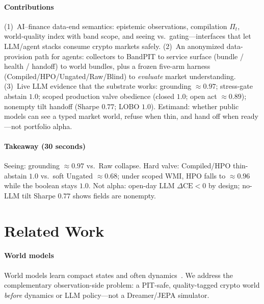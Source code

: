 \documentclass[sigconf,anonymous]{acmart}
\theoremstyle{acmdefinition}%
\theoremstyle{acmplain}%
\begin{document}
\paragraph{Contributions}
(1)~AI--finance data-end semantics: epistemic observations, compilation \(\Pi_t\), world-quality index with band scope, and seeing vs.\ gating---interfaces that let LLM/agent stacks consume crypto markets safely.
(2)~An anonymized data-provision path for agents: collectors to BandPIT to service surface (bundle / health / handoff) to world bundles, plus a frozen five-arm harness (Compiled/HPO/Ungated/Raw/Blind) to \emph{evaluate} market understanding.
(3)~Live LLM evidence that the substrate works: grounding \({\approx}0.97\); stress-gate abstain \(1.0\); scoped production valve obedience (closed \(1.0\); open act \({\approx}0.89\)); nonempty tilt handoff (Sharpe \(0.77\); LOBO \(1.0\)).
Estimand: whether public models can see a typed market world, refuse when thin, and hand off when ready---not portfolio alpha.

\paragraph{Takeaway (30 seconds)}
Seeing: grounding \({\approx}0.97\) vs.\ Raw collapse.
Hard valve: Compiled/HPO thin-abstain \(1.0\) vs.\ soft Ungated \({\approx}0.68\); under scoped WMI, HPO falls to \({\approx}0.96\) while the boolean stays \(1.0\).
Not alpha: open-day LLM \(\Delta\mathrm{CE}{<}0\) by design; no-LLM tilt Sharpe \(0.77\) shows fields are nonempty.

\section{Related Work}
\label{sec:related}

\paragraph{World models}
World models learn compact states and often dynamics~\cite{ha2018world,hafner2020dreamer,lecun2022path}.
We address the complementary observation-side problem: a PIT-safe, quality-tagged crypto world \emph{before} dynamics or LLM policy---not a Dreamer/JEPA simulator.
\end{document}

